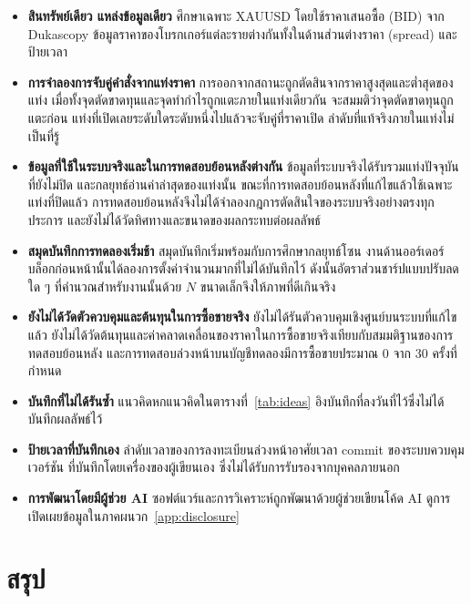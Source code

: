 \documentclass[11pt,a4paper]{article}
\newcommand{\tw}[1]{\texorpdfstring{\hspace{0pt}\mbox{#1}\hspace{0pt}}{#1}}
\begin{document}
\begin{itemize}
\item \textbf{สินทรัพย์เดียว แหล่งข้อมูลเดียว} ศึกษาเฉพาะ XAUUSD โดยใช้ราคาเสนอซื้อ (BID) จาก Dukascopy
ข้อมูลราคาของ\tw{โบรกเกอร์}แต่ละรายต่างกันทั้งในด้านส่วนต่างราคา (spread) และป้ายเวลา %
\item \textbf{การจำลองการจับคู่\tw{คำสั่ง}จากแท่งราคา} การออกจากสถานะถูกตัดสินจากราคาสูงสุดและต่ำสุดของแท่ง
เมื่อทั้งจุดตัดขาดทุนและจุดทำกำไรถูกแตะภายในแท่งเดียวกัน จะสมมติว่าจุดตัดขาดทุนถูกแตะก่อน
แท่งที่เปิดเลยระดับใดระดับหนึ่งไปแล้วจะจับคู่ที่ราคาเปิด ลำดับที่แท้จริงภายในแท่งไม่เป็นที่รู้ %
\item \textbf{ข้อมูลที่ใช้ในระบบจริงและในการทดสอบย้อนหลังต่างกัน} ข้อมูลที่ระบบจริง\tw{ได้รับ}รวมแท่งปัจจุบันที่ยังไม่ปิด
และกลยุทธ์อ่านค่าล่าสุดของแท่งนั้น ขณะที่การทดสอบย้อนหลังที่แก้ไขแล้วใช้เฉพาะแท่งที่ปิดแล้ว
การทดสอบย้อนหลังจึงไม่ได้จำลองกฎการ\tw{ตัดสินใจ}ของระบบจริงอย่างตรงทุกประการ
และยังไม่ได้วัดทิศทางและขนาดของผลกระทบต่อผลลัพธ์ %
\item \textbf{สมุดบันทึกการทดลองเริ่มช้า} สมุดบันทึกเริ่มพร้อมกับการศึกษากลยุทธ์โซน
งานด้าน\tw{ออร์เดอร์บล็อก}ก่อนหน้านั้นได้ลองการตั้งค่าจำนวนมากที่ไม่ได้บันทึกไว้
ดังนั้นอัตราส่วน\tw{ชาร์ป}แบบปรับลดใด ๆ ที่คำนวณสำหรับงานนั้นด้วย $N$ ขนาดเล็กจึงให้\tw{ภาพที่}ดีเกินจริง
\item \textbf{ยังไม่ได้วัดตัวควบคุมและต้นทุนในการ\tw{ซื้อขาย}จริง} ยังไม่ได้รันตัวควบคุมเชิงศูนย์บนระบบที่แก้ไขแล้ว
ยังไม่ได้วัดต้นทุนและค่า\tw{คลาดเคลื่อน}ของราคาในการ\tw{ซื้อขาย}จริงเทียบกับสมมติฐานของการทดสอบย้อนหลัง
และการทดสอบ\tw{ล่วงหน้า}บนบัญชีทดลองมีการ\tw{ซื้อขาย}ประมาณ 0 จาก 30 ครั้งที่กำหนด %
\item \textbf{บันทึกที่ไม่ได้รันซ้ำ} แนวคิดหกแนวคิดใน\tw{ตารางที่}~\ref{tab:ideas}
อิงบันทึกที่ลงวันที่ไว้ซึ่งไม่ได้บันทึกผลลัพธ์ไว้
\item \textbf{ป้ายเวลาที่บันทึกเอง} ลำดับเวลาของการลงทะเบียน\tw{ล่วงหน้า}อาศัยเวลา commit ของระบบควบคุม\tw{เวอร์ชัน}
ที่บันทึกโดยเครื่องของผู้เขียนเอง ซึ่งไม่\tw{ได้รับ}การรับรองจากบุคคลภายนอก %
\item \textbf{การพัฒนาโดยมีผู้ช่วย AI} ซอฟต์แวร์และการวิเคราะห์ถูกพัฒนาด้วยผู้ช่วยเขียนโค้ด AI
ดูการเปิดเผยข้อมูลใน\tw{ภาคผนวก}~\ref{app:disclosure}
\end{itemize}

\section{สรุป}
\end{document}
